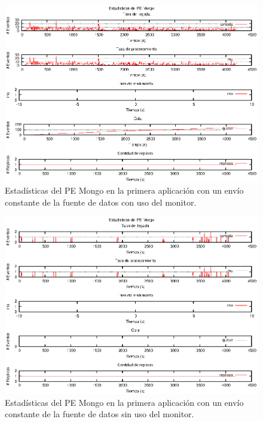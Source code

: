\begin{figure}[p]
\centering
    \includegraphics[scale=1.1]{images/exp/app2/uniform/cm/statusMergePE.eps}
    \caption{Estadísticas del PE Mongo en la primera aplicación con un envío constante de la fuente de datos con uso del monitor.}
    \label{fig:app2-uniform-statusMergePE-cm}
\end{figure}

\begin{figure}[p]
\centering
    \includegraphics[scale=1.1]{images/exp/app2/uniform/sm/statusMergePE.eps}
    \caption{Estadísticas del PE Mongo en la primera aplicación con un envío constante de la fuente de datos sin uso del monitor.}
    \label{fig:app2-uniform-statusMergePE-sm}
\end{figure}

